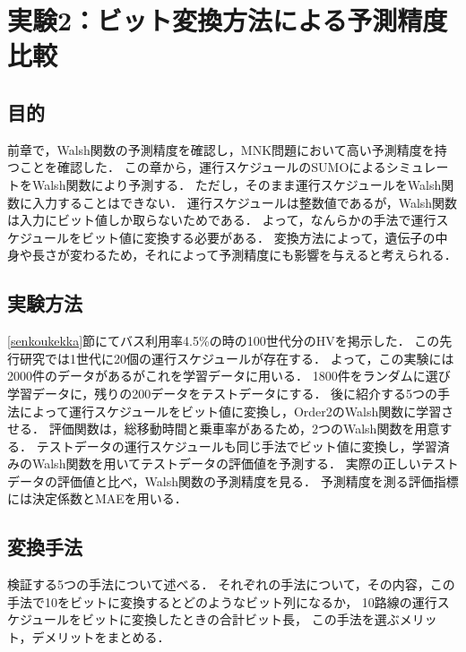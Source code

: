 \documentclass[main]{subfiles}
\begin{document}
\chapter{実験2：ビット変換方法による予測精度比較}
    \section{目的}
    前章で，Walsh関数の予測精度を確認し，MNK問題において高い予測精度を持つことを確認した．
    この章から，運行スケジュールのSUMOによるシミュレートをWalsh関数により予測する．
    ただし，そのまま運行スケジュールをWalsh関数に入力することはできない．
    運行スケジュールは整数値であるが，Walsh関数は入力にビット値しか取らないためである．
    よって，なんらかの手法で運行スケジュールをビット値に変換する必要がある．
    変換方法によって，遺伝子の中身や長さが変わるため，それによって予測精度にも影響を与えると考えられる．
    \section{実験方法}
    \ref{senkoukekka}節にてバス利用率4.5\%の時の100世代分のHVを掲示した．
    この先行研究では1世代に20個の運行スケジュールが存在する．
    よって，この実験には2000件のデータがあるがこれを学習データに用いる．
    1800件をランダムに選び学習データに，残りの200データをテストデータにする．
    後に紹介する5つの手法によって運行スケジュールをビット値に変換し，Order2のWalsh関数に学習させる．
    評価関数は，総移動時間と乗車率があるため，2つのWalsh関数を用意する．
    テストデータの運行スケジュールも同じ手法でビット値に変換し，学習済みのWalsh関数を用いてテストデータの評価値を予測する．
    実際の正しいテストデータの評価値と比べ，Walsh関数の予測精度を見る．
    予測精度を測る評価指標には決定係数とMAEを用いる．
    \section{変換手法}
    検証する5つの手法について述べる．
    それぞれの手法について，その内容，この手法で10をビットに変換するとどのようなビット列になるか，
    10路線の運行スケジュールをビットに変換したときの合計ビット長，
    この手法を選ぶメリット，デメリットをまとめる．
\end{document}
